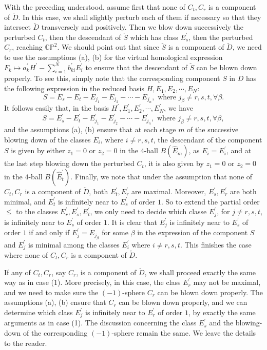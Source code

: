 \documentclass[11pt]{amsart}
\theoremstyle{plain}
\numberwithin{theorem}{section}
\theoremstyle{definition}
\newcommand{\C}{{\mathbb C}}
\renewcommand{\P}{{\mathbb P}}
\begin{document}
With the preceding understood, assume first that none of $C_t,C_r$ is a component of $\check{D}$.
In this case, we shall slightly perturb each of them if necessary so that they intersect $\check{D}$ 
transversely and positively. Then we blow down successively the perturbed $C_t$, then the 
descendant of $\check{S}$ which has class $E_s^\prime$, then the perturbed $C_r$, reaching
$\C\P^2$. We should point out that since $\check{S}$ is a component of $\check{D}$, we need to use the assumptions (a), (b) for the virtual homological expression 
$F_k\mapsto a_k^\prime H^\prime-\sum_{i=1}^N b_{ki}^\prime E_i^\prime$ to ensure that the descendant 
of $\check{S}$ can be blown down properly. To see this, simply note that the corresponding component $S$ in $D$
has the following expression in the reduced basis $H,E_1,E_2,\cdots, E_N$:
$$
S=E_s-E_t-E_{j_1}-E_{j_2}-\cdots-E_{j_n}, \mbox{ where } j_\beta\neq r, s,t, \forall \beta.
$$
It follows easily that, in the basis $H^\prime,E_1^\prime,E_2^\prime,\cdots, E_N^\prime$, we have
$$
S=E_s^\prime-E_t^\prime-E_{j_1}^\prime-E_{j_2}^\prime-\cdots-E_{j_n}^\prime, \mbox{ where } j_\beta\neq r, s,t, \forall \beta,
$$
and the assumptions (a), (b) ensure that at each stage $m$ of the successive blowing down of the classes $E_i$, where $i\neq r,s,t$, the descendant of the component $S$ is given by either 
$z_1=0$ or $z_2=0$ in the $4$-ball $B(\hat{E}_m)$, as $E_i=E_i^\prime$, and at the last step blowing down 
the perturbed $C_t$, it is also given by $z_1=0$ or $z_2=0$ in the $4$-ball $B(\hat{E}_t^\prime)$. Finally,
we note that under the assumption that none of $C_t,C_r$ is a component of $\check{D}$,
both $E_t^\prime,E_r^\prime$ are maximal. Moreover, $E_s^\prime,E_r^\prime$
are both minimal, and $E_t^\prime$ is infinitely near to $E_s^\prime$ of order $1$. So to extend the partial order
$\leq$ to the classes $E_r^\prime,E_s^\prime,E_t^\prime$, we only need to decide which classe $E_j^\prime$,
for $j\neq r,s,t$, is infinitely near to $E_s^\prime$ of order $1$. It is clear that $E_j^\prime$ is infinitely near to $E_s^\prime$ of order $1$ if and only if $E_j^\prime=E_{j_\beta}$ for some $\beta$ in the expression of the component $S$ and $E_j^\prime$ is minimal among the classes $E_i^\prime$ where $i\neq r,s,t$. This finishes the
case where none of $C_t,C_r$ is a component of $\check{D}$.

If any of $C_t,C_r$, say $C_r$, is a component of $\check{D}$, we shall proceed exactly the same way as in case (1). More precisely, in this case, the class $E_r^\prime$ may not be maximal, and we need to make sure the $(-1)$-sphere $C_r$ can be blown down properly. The assumptions (a), (b) ensure that  $C_r$ can be blown down properly, and we can determine which class $E_j^\prime$ is infinitely near to $E_r^\prime$ of order $1$, by exactly the same arguments as in case (1). The discussion concerning the class $E_s^\prime$ and the blowing-down of the corresponding $(-1)$-sphere remain the same. We leave the details to the reader. 
\end{document}
